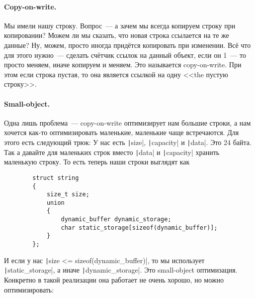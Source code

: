 \documentclass{article}
\begin{document}
    \paragraph{Copy-on-write.}
    Мы имели нашу строку. Вопрос~--- а зачем мы всегда копируем строку при копировании? Можем ли мы сказать, что новая строка ссылается на те же данные? Ну, можем, просто иногда придётся копировать при изменении. Всё что для этого нужно~--- сделать счётчик ссылок на данный объект, если он 1~--- то просто меняем, иначе копируем и меняем. Это называется copy-on-write. При этом если строка пустая, то она является ссылкой на одну <<the пустую строку>>.
    \paragraph{Small-object.}
    Одна лишь проблема~--- copy-on-write оптимизирует нам большие строки, а нам хочется как-то оптимизировать маленькие, маленькие чаще встречаются. Для этого есть следующий трюк: У нас есть \texttt|size|, \texttt|capacity| и \texttt|data|. Это 24 байта. Так а давайте для маленьких строк вместо \texttt|data| и \texttt|capacity| хранить маленькую строку. То есть теперь наши строки выглядят как
    \begin{verbatim}
        struct string
        {
            size_t size;
            union
            {
                dynamic_buffer dynamic_storage;
                char static_storage[sizeof(dynamic_buffer)];
            }
        };
    \end{verbatim}
    И если у нас \texttt|size <= sizeof(dynamic_buffer)|, то мы использует \texttt|static_storage|, а иначе \texttt|dynamic_storage|.
    Это small-object оптимизация. Конкретно в такой реализации она работает не очень хорошо, но можно оптимизировать:
\end{document}
